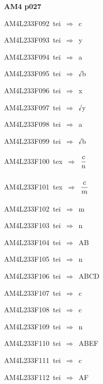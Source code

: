 \par\vfill\eject
{\bf\hfill AM4 p027\hfill\hbox{}}\par\bigskip
{\sixrm AM4L233F092\ {\sixit tei}\ }$\Rightarrow$\ {\tenit c}\par\smallskip
{\sixrm AM4L233F093\ {\sixit tei}\ }$\Rightarrow$\ {\tenit y}\par\smallskip
{\sixrm AM4L233F094\ {\sixit tei}\ }$\Rightarrow$\ {\tenit a}\par\smallskip
{\sixrm AM4L233F095\ {\sixit tei}\ }$\Rightarrow$\ √{\tenit b}\par\smallskip
{\sixrm AM4L233F096\ {\sixit tei}\ }$\Rightarrow$\ {\tenit x}\par\smallskip
{\sixrm AM4L233F097\ {\sixit tei}\ }$\Rightarrow$\ √{\tenit y}\par\smallskip
{\sixrm AM4L233F098\ {\sixit tei}\ }$\Rightarrow$\ {\tenit a}\par\smallskip
{\sixrm AM4L233F099\ {\sixit tei}\ }$\Rightarrow$\ √{\tenit b}\par\smallskip
{\sixrm AM4L233F100\ {\sixit tex}\ }$\Rightarrow$\ ${\displaystyle\strut c\over \displaystyle\strut n}$\par\smallskip
{\sixrm AM4L233F101\ {\sixit tex}\ }$\Rightarrow$\ ${\displaystyle\strut c\over \displaystyle\strut m}$\par\smallskip
{\sixrm AM4L233F102\ {\sixit tei}\ }$\Rightarrow$\ {\tenit m}\par\smallskip
{\sixrm AM4L233F103\ {\sixit tei}\ }$\Rightarrow$\ {\tenit n}\par\smallskip
{\sixrm AM4L233F104\ {\sixit tei}\ }$\Rightarrow$\ AB\par\smallskip
{\sixrm AM4L233F105\ {\sixit tei}\ }$\Rightarrow$\ {\tenit n}\par\smallskip
{\sixrm AM4L233F106\ {\sixit tei}\ }$\Rightarrow$\ ABCD\par\smallskip
{\sixrm AM4L233F107\ {\sixit tei}\ }$\Rightarrow$\ {\tenit c}\par\smallskip
{\sixrm AM4L233F108\ {\sixit tei}\ }$\Rightarrow$\ {\tenit c}\par\smallskip
{\sixrm AM4L233F109\ {\sixit tei}\ }$\Rightarrow$\ {\tenit n}\par\smallskip
{\sixrm AM4L233F110\ {\sixit tei}\ }$\Rightarrow$\ ABEF\par\smallskip
{\sixrm AM4L233F111\ {\sixit tei}\ }$\Rightarrow$\ {\tenit c}\par\smallskip
{\sixrm AM4L233F112\ {\sixit tei}\ }$\Rightarrow$\ AF\par\smallskip
